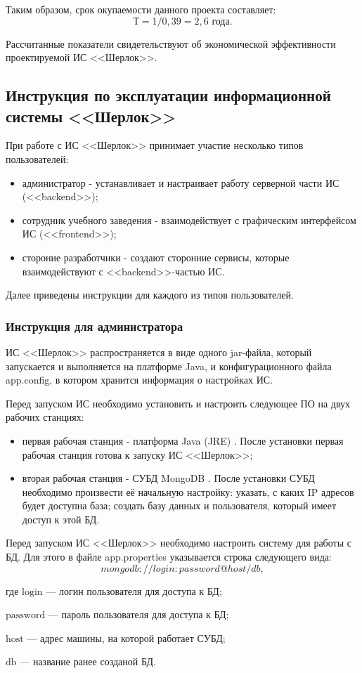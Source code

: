 			Таким образом, срок окупаемости данного проекта составляет:
			$$\text{Т} = 1 / 0,39 = 2,6 \text{ года}.$$

			Рассчитанные показатели свидетельствуют об экономической эффективности проектируемой ИС <<Шерлок>>.

	\subsection{Инструкция по эксплуатации информационной системы <<Шерлок>>}

		При работе с ИС <<Шерлок>> принимает участие несколько типов пользователей:
		\begin{itemize}
			\item администратор - устанавливает и настраивает работу серверной части ИС (<<backend>>);
			\item сотрудник учебного заведения - взаимодействует с графическим интерфейсом ИС (<<frontend>>);
			\item стороние разработчики - создают сторонние сервисы, которые взаимодействуют с <<backend>>-частью ИС.			
		\end{itemize}

		Далее приведены инструкции для каждого из типов пользователей.

		\subsubsection{Инструкция для администратора}

			ИС <<Шерлок>> распространяется в виде одного jar-файла, который запускается и выполняется на платформе Java, и конфигурационного файла app.config, в котором хранится информация о настройках ИС.

			Перед запуском ИС необходимо установить и настроить следующее ПО на двух рабочих станциях:
			\begin{itemize}
				\item первая рабочая станция - платформа Java (JRE) \cite{web:java}. После установки первая рабочая станция готова к запуску ИС <<Шерлок>>;
				\item вторая рабочая станция - СУБД MongoDB \cite{web:mongodb}. После установки СУБД необходимо произвести её начальную настройку: указать, с каких IP адресов будет доступна база; создать базу данных и пользователя, который имеет доступ к этой БД.
			\end{itemize}

			Перед запуском ИС <<Шерлок>> необходимо настроить систему для работы с БД. Для этого в файле app.properties указывается строка следующего вида:
			$$mongodb://{login}:{password}@{host}/{db},$$
			\begin{ESKDexplanation}
				\item[где ] $\text{login}$ --- логин пользователя для доступа к БД;
				\item $\text{password}$ --- пароль пользователя для доступа к БД;
				\item $\text{host}$ --- адрес машины, на которой работает СУБД;
				\item $\text{db}$ --- название ранее созданой БД.				
			\end{ESKDexplanation}

